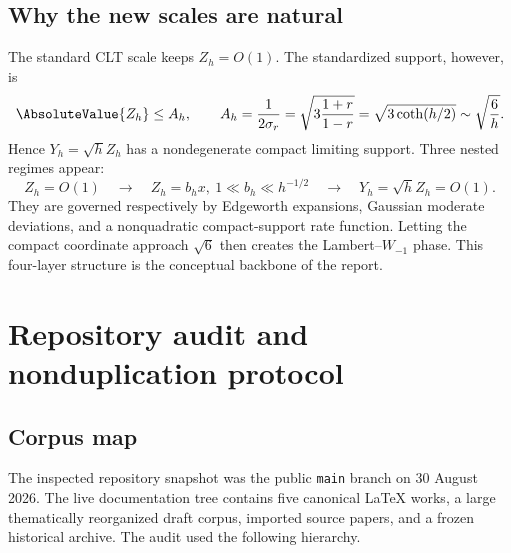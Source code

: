\documentclass[11pt]{article}
\numberwithin{equation}{section}
\theoremstyle{definition}
\begin{document}
\subsection{Why the new scales are natural}
The standard CLT scale keeps \(Z_h=O(1)\).  The standardized support, however, is
\begin{equation}\label{eq:standardized-support}
 \AbsoluteValue{Z_h}\le A_h,
 \qquad
 A_h=\frac{1}{2\sigma_r}=\sqrt{3\frac{1+r}{1-r}}
 =\sqrt{3\coth(h/2)}\sim\sqrt{\frac6h}.
\end{equation}
Hence \(Y_h=\sqrt h Z_h\) has a nondegenerate compact limiting support.  Three nested regimes appear:
\[
 Z_h=O(1)
 \quad\longrightarrow\quad
 Z_h=b_hx,\ 1\ll b_h\ll h^{-1/2}
 \quad\longrightarrow\quad
 Y_h=\sqrt h Z_h=O(1).
\]
They are governed respectively by Edgeworth expansions, Gaussian moderate deviations, and a nonquadratic compact-support rate function.  Letting the compact coordinate approach \(\sqrt6\) then creates the Lambert--\(W_{-1}\) phase.  This four-layer structure is the conceptual backbone of the report.

\section{Repository audit and nonduplication protocol}\label{sec:audit}

\subsection{Corpus map}
The inspected repository snapshot was the public \texttt{main} branch on 30 August 2026.  The live documentation tree contains five canonical LaTeX works, a large thematically reorganized draft corpus, imported source papers, and a frozen historical archive.  The audit used the following hierarchy.
\end{document}
